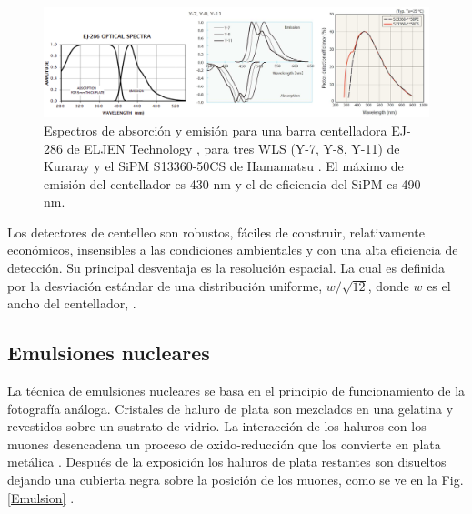 \begin{figure}[h!]
\begin{center}
\includegraphics[width=1\textwidth]{Figures/WLS}
\caption[Espectros de absorción y emisión para una barra centelladora EJ-286 de ELJEN Technology, para tres WLS (Y-7, Y-8, Y-11) de Kurarayy el SiPM S13360-50CS de Hamamatsu ]{Espectros de absorción y emisión para una barra centelladora EJ-286 de ELJEN Technology \cite{Eljen2016}, para tres WLS (Y-7, Y-8, Y-11) de Kuraray \cite{Kuraray2018} y el SiPM S13360-50CS de Hamamatsu \cite{Hamamatsy2018}. El máximo de emisión del centellador es 430 nm y el de eficiencia del SiPM es 490 nm.}
\label{WLS}
\end{center}
\end{figure}

Los detectores de centelleo son robustos, fáciles de construir, relativamente económicos, insensibles a las condiciones ambientales y con una alta eficiencia de detección. Su principal desventaja es la resolución espacial. La cual es definida por la desviación estándar de una distribución uniforme, $w/\sqrt{12}$, donde $w$ es el ancho del centellador, \cite{Procureur2018}. 

\subsection{Emulsiones nucleares}

La técnica de emulsiones nucleares se basa en el principio de funcionamiento de la fotografía análoga. Cristales de haluro de plata son mezclados en una gelatina y revestidos sobre un sustrato de vidrio. La interacción de los haluros con los muones desencadena un proceso de oxido-reducción que los convierte en plata metálica \cite{Procureur2018}. Después de la exposición los haluros de plata restantes son disueltos dejando una cubierta negra sobre la posición de los muones, como se ve en la Fig. \ref{Emulsion} .  

